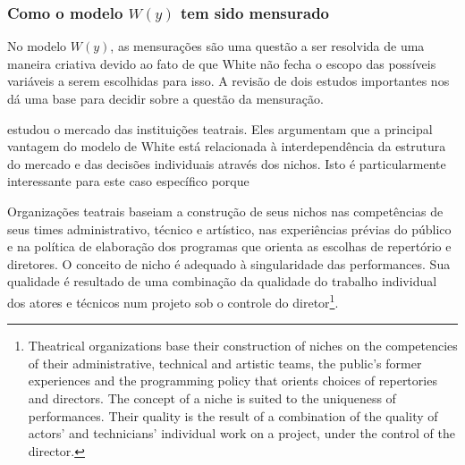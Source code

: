 \documentclass[a4paper, 12pt, openright, oneside, german, french, english, brazil]{abntex2}
\begin{document}
	\subsubsection{Como o modelo $W(y)$ tem sido mensurado}
	
	
	No modelo $W(y)$, as mensurações são uma questão a ser resolvida de uma maneira criativa devido ao fato de que White não fecha o escopo das possíveis variáveis a serem escolhidas para isso. A revisão de dois estudos importantes nos dá uma base para decidir sobre a questão da mensuração.
	
	
	 estudou o mercado das instituições teatrais. Eles argumentam que a principal vantagem do modelo de White está relacionada à interdependência da estrutura do mercado e das decisões individuais através dos nichos. Isto é particularmente interessante para este caso específico porque
	
	\begin{citacao}
		Organizações teatrais baseiam a construção de seus nichos nas competências de seus times administrativo, técnico e artístico, nas experiências prévias do público e na política de elaboração dos programas que orienta as escolhas de repertório e diretores. O conceito de nicho é adequado à singularidade das performances. Sua qualidade é resultado de uma combinação da qualidade do trabalho individual dos atores e técnicos num projeto sob o controle do diretor\footnote{Theatrical organizations base their construction of niches on the competencies of their administrative, technical and artistic teams, the public's former experiences and the programming policy that orients choices of repertories and directors. The concept of a niche is suited to the uniqueness of performances. Their quality is the result of a combination of the quality of actors' and technicians' individual work on a project, under the control of the director.}. \cite[p. 255]{biencourt2002market}
	\end{citacao}
	
\end{document}
